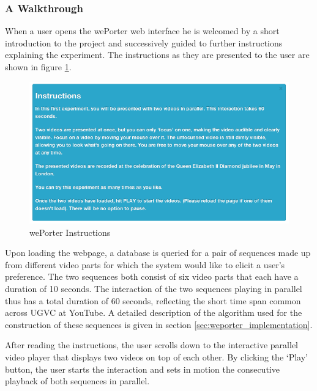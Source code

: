 \subsubsection{A Walkthrough}
When a user opens the wePorter web interface he is welcomed by a short introduction to the project and successively guided to further instructions explaining the experiment. The instructions as they are presented to the user are shown in figure \ref{fig:instructions}.

\begin{figure}[htbp]
  \centering
    \includegraphics[width=\textwidth]{img/instructions}
  \caption{wePorter Instructions}
  \label{fig:instructions}
\end{figure}

Upon loading the webpage, a database is queried for a pair of sequences made up from different video parts for which the system would like to elicit a user's preference. The two sequences both consist of six video parts that each have a duration of 10 seconds. The interaction of the two sequences playing in parallel thus has a total duration of 60 seconds, reflecting the short time span common across UGVC at YouTube\cite{Cha:2007ty, Cheng:2007tc}. A detailed description of the algorithm used for the construction of these sequences is given in section \ref{sec:weporter_implementation}.

After reading the instructions, the user scrolls down to the interactive parallel video player that displays two videos on top of each other. By clicking the `Play' button, the user starts the interaction and sets in motion the consecutive playback of both sequences in parallel.

